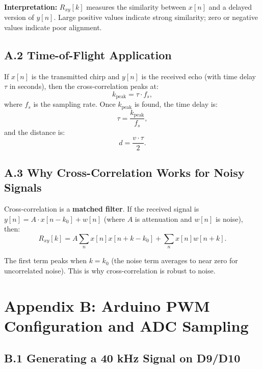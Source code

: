 \documentclass[11pt,letterpaper]{article}
\begin{document}
\textbf{Interpretation:} $R_{xy}[k]$ measures the similarity between $x[n]$ and a delayed version of $y[n]$. Large positive values indicate strong similarity; zero or negative values indicate poor alignment.

\subsection*{A.2 Time-of-Flight Application}

If $x[n]$ is the transmitted chirp and $y[n]$ is the received echo (with time delay $\tau$ in seconds), then the cross-correlation peaks at:
\begin{equation}
k_{\text{peak}} = \tau \cdot f_s,
\end{equation}
where $f_s$ is the sampling rate. Once $k_{\text{peak}}$ is found, the time delay is:
\begin{equation}
\tau = \frac{k_{\text{peak}}}{f_s},
\end{equation}
and the distance is:
\begin{equation}
d = \frac{v \cdot \tau}{2}.
\end{equation}

\subsection*{A.3 Why Cross-Correlation Works for Noisy Signals}

Cross-correlation is a \textbf{matched filter}. If the received signal is $y[n] = A \cdot x[n - k_0] + w[n]$ (where $A$ is attenuation and $w[n]$ is noise), then:
\begin{equation}
R_{xy}[k] = A \sum_{n} x[n] x[n + k - k_0] + \sum_{n} x[n] w[n + k].
\end{equation}

The first term peaks when $k = k_0$ (the noise term averages to near zero for uncorrelated noise). This is why cross-correlation is robust to noise.

\clearpage

\section*{Appendix B: Arduino PWM Configuration and ADC Sampling}

\subsection*{B.1 Generating a 40 kHz Signal on D9/D10}
\end{document}
